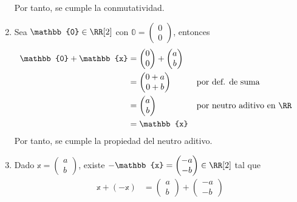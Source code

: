 \begin{examplebox}{}{}
\begin{enumerate}[label=\roman*), topsep=6pt, itemsep=0pt]
        Por tanto, se cumple la conmutatividad.
        \item Sea $\mathbb{0} \in \RR[2]$ con $\mathbb{0} = \begin{pmatrix}
            0 \\
            0
        \end{pmatrix}$, entonces
        \begin{align*}
            \mathbb{0} + \mathbb{x} & = \begin{pmatrix}
                0 \\
                0
            \end{pmatrix} + \begin{pmatrix}
                a \\
                b
            \end{pmatrix} \\
            & = \begin{pmatrix}
                0 + a \\
                0 + b
            \end{pmatrix} && \text{por def. de suma} \\
            & = \begin{pmatrix}
                a \\
                b
            \end{pmatrix} && \text{por neutro aditivo en $\RR$} \\
            & = \mathbb{x}
        \end{align*}
        Por tanto, se cumple la propiedad del neutro aditivo.
        \item Dado $\mathbb{x} = \begin{pmatrix}
            a \\
            b
        \end{pmatrix}$, existe $-\mathbb{x} = \begin{pmatrix}
            -a \\
            -b
        \end{pmatrix} \in \RR[2]$ tal que
        \begin{align*}
            \mathbb{x} + (-\mathbb{x}) & = \begin{pmatrix}
                a \\
                b
            \end{pmatrix} + \begin{pmatrix}
                -a \\
                -b
            \end{pmatrix} \\

\end{align*}
\end{enumerate}
\end{examplebox}
